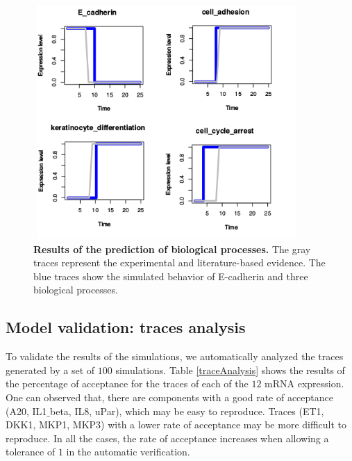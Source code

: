 \begin{figure}[H]
\centering
\includegraphics[width=4in,height=3.5in]{images/key_nodes1.png}
\caption{{\bf Results of the prediction of biological processes.} The gray traces represent the experimental and literature-based evidence.
The blue traces show the simulated behavior of E-cadherin and three biological processes.}
\label{fig:knodes}
\end{figure}

\subsection{Model validation: traces analysis}

To validate the results of the simulations, we automatically analyzed the traces generated by a set of $100$ simulations. Table \ref{traceAnalysis} shows the results
of the percentage of acceptance for the traces of each of the $12$ mRNA expression. One can observed that, there are components with a good 
rate of acceptance (A20, IL1$\_$beta, IL8, uPar), which may be easy to reproduce. Traces (ET1, DKK1, MKP1, MKP3) with a lower rate of acceptance may be more difficult to reproduce.
In all the cases, the rate of acceptance increases when allowing a tolerance of $1$ in the automatic verification. 



